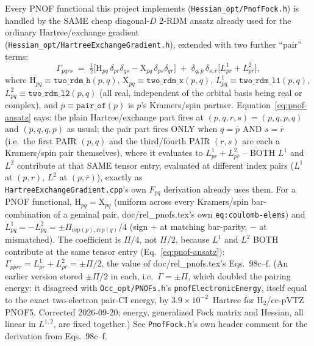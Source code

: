 \documentclass[11pt]{article}
\begin{document}
Every PNOF functional this project implements (\texttt{Hessian\_opt/PnofFock.h})
is handled by the SAME cheap diagonal-$D$ 2-RDM ansatz already used for
the ordinary Hartree/exchange gradient (\texttt{Hessian\_opt/HartreeExchangeGradient.h}),
extended with two further ``pair'' terms:
\begin{equation}
\Gamma_{pqrs} \;=\;
\tfrac12\Big[\mathrm{H}_{pq}\,\delta_{pr}\delta_{qs} - \mathrm{X}_{pq}\,\delta_{ps}\delta_{qr}\Big]
\;+\; \delta_{q,\bar p}\,\delta_{s,\bar r}\Big[L^{1}_{pr} + L^{2}_{p\bar r}\Big],
\label{eq:pnof-ansatz}
\end{equation}
where $\mathrm{H}_{pq}\equiv\texttt{two\_rdm\_h}(p,q)$, $\mathrm{X}_{pq}\equiv
\texttt{two\_rdm\_x}(p,q)$, $L^{1}_{pq}\equiv\texttt{two\_rdm\_l1}(p,q)$,
$L^{2}_{pq}\equiv\texttt{two\_rdm\_l2}(p,q)$ (all real, independent of the
orbital basis being real or complex), and $\bar p\equiv\texttt{pair\_of}(p)$
is $p$'s Kramers/spin partner. Equation~\eqref{eq:pnof-ansatz} says: the
plain Hartree/exchange part fires at $(p,q,r,s)=(p,q,p,q)$ and $(p,q,q,p)$
as usual; the pair part fires ONLY when $q=\bar p$ AND $s=\bar r$ (i.e.\ the
first PAIR $(p,q)$ and the third/fourth PAIR $(r,s)$ are each a Kramers/spin
pair themselves), where it evaluates to $L^{1}_{pr}+L^{2}_{p\bar r}$ --
BOTH $L^1$ and $L^2$ contribute at that SAME tensor entry, evaluated at
different index pairs ($L^1$ at $(p,r)$, $L^2$ at $(p,\bar r)$), exactly
as\\ \texttt{HartreeExchangeGradient.cpp}'s own $F_{pq}$ derivation already
uses them. For a PNOF functional, $\mathrm{H}_{pq}=\mathrm{X}_{pq}$
(uniform across every Kramers/spin bar-combination of a geminal pair,
doc/rel\_pnofs.tex's own \texttt{eq:coulomb-elems}) and $L^{1}_{pq}=
-L^{2}_{pq}=\pm\Pi_{\text{rep}(p),\text{rep}(q)}/4$ (sign $+$ at matching
bar-parity, $-$ at mismatched). The coefficient is $\Pi/4$, not $\Pi/2$,
because $L^1$ and $L^2$ BOTH contribute at the same tensor entry
(Eq.~\eqref{eq:pnof-ansatz}): $\Gamma_{p\bar p r\bar r}=L^1_{pr}+L^2_{p\bar r}=
\pm\Pi/2$, the value of doc/rel\_pnofs.tex's Eqs.~98c--f. (An earlier
version stored $\pm\Pi/2$ in each, i.e.\ $\Gamma=\pm\Pi$, which doubled the
pairing energy: it disagreed with \texttt{Occ\_opt/PNOFs.h}'s
\texttt{pnofElectronicEnergy}, itself equal to the exact two-electron
pair-CI energy, by $3.9\times10^{-2}$~Hartree for H$_2$/cc-pVTZ PNOF5.
Corrected 2026-09-20; energy, generalized Fock matrix and Hessian, all
linear in $L^{1,2}$, are fixed together.) See \texttt{PnofFock.h}'s own
header comment for the derivation from Eqs.~98c--f.
\end{document}
